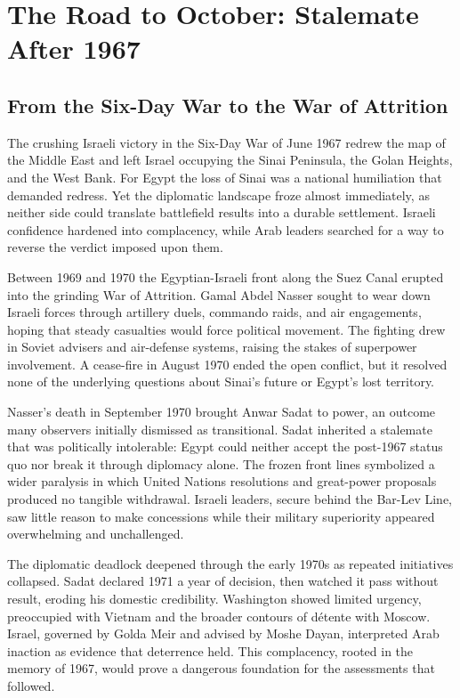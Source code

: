\section{The Road to October: Stalemate After 1967}

\subsection{From the Six-Day War to the War of Attrition}
The crushing Israeli victory in the Six-Day War of June 1967 redrew the map of the Middle East and left Israel occupying the Sinai Peninsula, the Golan Heights, and the West Bank. For Egypt the loss of Sinai was a national humiliation that demanded redress. Yet the diplomatic landscape froze almost immediately, as neither side could translate battlefield results into a durable settlement. Israeli confidence hardened into complacency, while Arab leaders searched for a way to reverse the verdict imposed upon them.

Between 1969 and 1970 the Egyptian-Israeli front along the Suez Canal erupted into the grinding War of Attrition. Gamal Abdel Nasser sought to wear down Israeli forces through artillery duels, commando raids, and air engagements, hoping that steady casualties would force political movement. The fighting drew in Soviet advisers and air-defense systems, raising the stakes of superpower involvement. A cease-fire in August 1970 ended the open conflict, but it resolved none of the underlying questions about Sinai's future or Egypt's lost territory.

Nasser's death in September 1970 brought Anwar Sadat to power, an outcome many observers initially dismissed as transitional. Sadat inherited a stalemate that was politically intolerable: Egypt could neither accept the post-1967 status quo nor break it through diplomacy alone. The frozen front lines symbolized a wider paralysis in which United Nations resolutions and great-power proposals produced no tangible withdrawal. Israeli leaders, secure behind the Bar-Lev Line, saw little reason to make concessions while their military superiority appeared overwhelming and unchallenged.

The diplomatic deadlock deepened through the early 1970s as repeated initiatives collapsed. Sadat declared 1971 a year of decision, then watched it pass without result, eroding his domestic credibility. Washington showed limited urgency, preoccupied with Vietnam and the broader contours of détente with Moscow. Israel, governed by Golda Meir and advised by Moshe Dayan, interpreted Arab inaction as evidence that deterrence held. This complacency, rooted in the memory of 1967, would prove a dangerous foundation for the assessments that followed.

